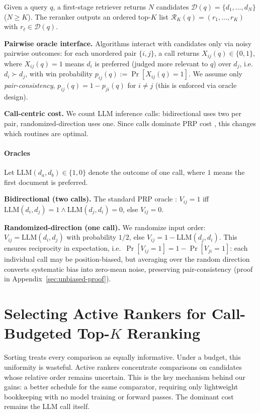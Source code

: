 \documentclass[11pt]{article}
\begin{document}
Given a query $q$, a first-stage retriever returns $N$ candidates
$\mathcal{D}(q)=\{d_1,\dots,d_N\}$ ($N\ge K$). The reranker outputs an ordered
top-$K$ list $\mathcal{R}_K(q)=(r_1,\dots,r_K)$ with $r_\ell \in \mathcal{D}(q)$.

\noindent\textbf{Pairwise oracle interface.}
Algorithms interact with candidates only via noisy pairwise outcomes: for each unordered pair $\{i,j\}$, a call returns $X_{ij}(q)\in\{0,1\}$, where $X_{ij}(q)=1$ means $d_i$ is preferred (judged more relevant to $q$) over $d_j$, i.e.\ $d_i \succ d_j$, with win probability $p_{ij}(q):=\Pr[X_{ij}(q)=1]$.
We assume only \emph{pair-consistency}, $p_{ij}(q)=1-p_{ji}(q)$ for $i\neq j$ (this is enforced via oracle design).

\noindent\textbf{Call-centric cost.}
We count LLM inference calls: bidirectional uses two per pair, randomized-direction uses one. Since calls dominate PRP cost \citep{wisznia2025batchingcaching}, this changes which routines are optimal.

\vspace{-0.2cm}
\paragraph{Oracles} Let $\text{LLM}(d_a, d_b) \in \{1, 0\}$ denote the outcome of one call, where $1$ means the first document is preferred.

\noindent\textbf{Bidirectional (two calls).}
The standard PRP oracle \citep{qin2024pairwise}: $V_{ij}=1$ iff $\text{LLM}(d_i,d_j)=1 \wedge \text{LLM}(d_j,d_i)=0$, else $V_{ij}=0$.

\noindent\textbf{Randomized-direction (one call).}
We randomize input order: $V_{ij}=\text{LLM}(d_i,d_j)$ with probability $1/2$, else $V_{ij}=1-\text{LLM}(d_j,d_i)$. This ensures reciprocity in expectation, i.e.\ $\Pr[V_{ij}{=}1] = 1 - \Pr[V_{ji}{=}1]$: each individual call may be position-biased, but averaging over the random direction converts systematic bias into zero-mean noise, preserving pair-consistency (proof in Appendix~\ref{sec:unbiased-proof}).

\section{Selecting Active Rankers for Call-Budgeted Top-$K$ Reranking}
\label{sec:select_active_rankers}

Sorting treats every comparison as equally informative. Under a budget, this uniformity is wasteful. Active rankers concentrate comparisons on candidates whose relative order remains uncertain. This is the key mechanism behind our gains: a better schedule for the same comparator, requiring only lightweight bookkeeping with no model training or forward passes. The dominant cost remains the LLM call itself.
\end{document}
